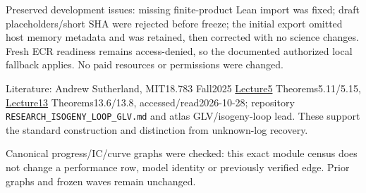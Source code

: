 \documentclass[
  10pt,
]{article}
\begin{document}
Preserved development issues: missing finite-product Lean import was
fixed; draft placeholders/short SHA were rejected before freeze; the
initial export omitted host memory metadata and was retained, then
corrected with no science changes. Fresh ECR readiness remains
access-denied, so the documented authorized local fallback applies. No
paid resources or permissions were changed.

Literature: Andrew Sutherland, MIT18.783 Fall2025
\href{https://math.mit.edu/classes/18.783/2025/LectureNotes5.pdf}{Lecture5}
Theorems5.11/5.15,
\href{https://math.mit.edu/classes/18.783/2025/LectureNotes13.pdf}{Lecture13}
Theorems13.6/13.8, accessed/read2026-10-28; repository
\texttt{RESEARCH\_ISOGENY\_LOOP\_GLV.md} and atlas GLV/isogeny-loop
lead. These support the standard construction and distinction from
unknown-log recovery.

Canonical progress/IC/curve graphs were checked: this exact module
census does not change a performance row, model identity or previously
verified edge. Prior graphs and frozen waves remain unchanged.
\end{document}

